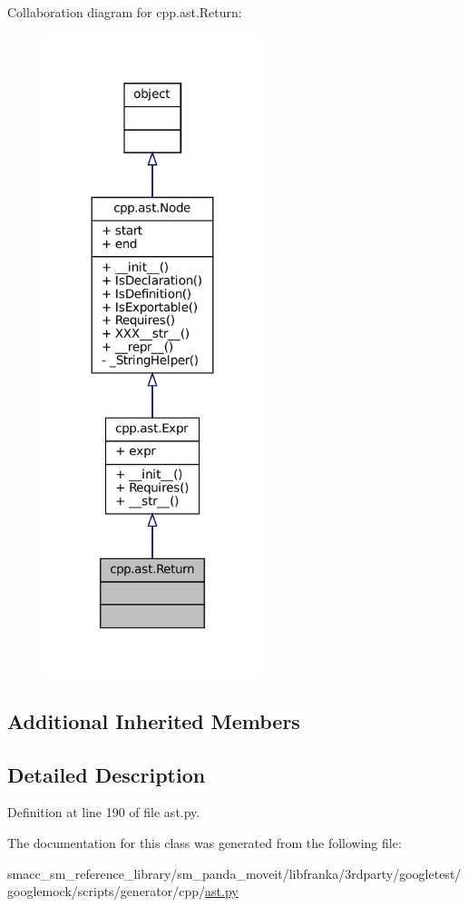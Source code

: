 Collaboration diagram for cpp.\+ast.\+Return\+:
\nopagebreak
\begin{figure}[H]
\begin{center}
\leavevmode
\includegraphics[width=180pt]{classcpp_1_1ast_1_1Return__coll__graph}
\end{center}
\end{figure}
\subsection*{Additional Inherited Members}


\subsection{Detailed Description}


Definition at line 190 of file ast.\+py.



The documentation for this class was generated from the following file\+:\begin{DoxyCompactItemize}
\item 
smacc\+\_\+sm\+\_\+reference\+\_\+library/sm\+\_\+panda\+\_\+moveit/libfranka/3rdparty/googletest/googlemock/scripts/generator/cpp/\hyperlink{ast_8py}{ast.\+py}\end{DoxyCompactItemize}
